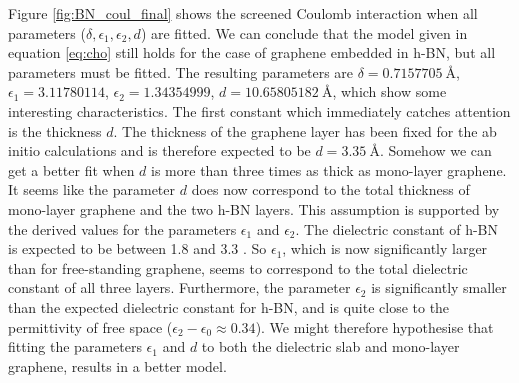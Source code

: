Figure \ref{fig:BN_coul_final} shows the screened Coulomb interaction when all parameters ($\delta, \epsilon_1,\epsilon_2,d$) are fitted. We can conclude that the model given in equation \ref{eq:cho} still holds for the case of graphene embedded in h-BN, but all parameters must be fitted. The resulting parameters are $\delta = \SI{0.7157705}{\angstrom}$, $\epsilon_1 = 3.11780114$, $\epsilon_2 = 1.34354999$, $d = \SI{10.65805182}{\angstrom}$, which show some interesting characteristics. The first constant which immediately catches attention is the thickness $d$. The thickness of the graphene layer has been fixed for the ab initio calculations and is therefore expected to be $d=\SI{3.35}{\angstrom}$. Somehow we can get a better fit when $d$ is more than three times as thick as mono-layer graphene. It seems like the parameter $d$ does now correspond to the total thickness of mono-layer graphene and the two h-BN layers. This assumption is supported by the derived values for the parameters $\epsilon_1$ and $\epsilon_2$. The dielectric constant of h-BN is expected to be between 1.8 and 3.3 \cite{Steinke2020, Laturia2018}. So $\epsilon_1$, which is now significantly larger than for free-standing graphene, seems to correspond to the total dielectric constant of all three layers. Furthermore, the parameter $\epsilon_2$ is significantly smaller than the expected dielectric constant for h-BN, and is quite close to the permittivity of free space ($\epsilon_2-\epsilon_0\approx0.34$). We might therefore hypothesise that fitting the parameters $\epsilon_1$ and $d$ to both the dielectric slab and mono-layer graphene, results in a better model.

